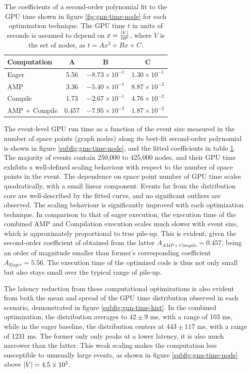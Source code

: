 \begin{table}[ht]
    \centering
    \begin{tabular}{|l|c|c|c|} \hline
      {Computation}   &  {A} & {B} & {C} \\ \hline 
      \hline
       Eager  & 5.56 & $-8.73\times 10^{-1}$ & $1.30\times 10^{-1}$ \\
       AMP & 3.36 & $-5.40\times 10^{-1}$ & $8.87\times10^{-2}$ \\
       Compile & 1.73 & $-2.67\times 10^{-1}$  & $4.76\times 10^{-2}$ \\
       AMP + Compile & 0.457 & $-7.95\times 10^{-2}$ & $1.87\times 10^{-2}$ \\ \hline
    \end{tabular}
    \caption{The coefficients of a second-order polynomial fit to the GPU time shown in figure \ref{fig:gnn-time-node} for each optimization technique. The GPU time $t$ in units of seconds is assumed to depend on $x=\frac{\abs{V}}{10^6}$, where $V$ is the set of nodes, as $t=Ax^2+Bx+C$.}
    \label{tab:gnn-time-node-fit}
\end{table}
The event-level GPU run time as a function of the event size measured in the number of space points (graph nodes) along its best-fit second-order polynomial is shown in figure \ref{subfig:gnn-time-node}, and the fitted coefficients in table \ref{tab:gnn-time-node-fit}.
The majority of events contain 250,000 to 425,000 nodes, and their GPU time exhibits a well-defined scaling behaviour with respect to the number of space points in the event.
The dependence on space point number of GPU time scales quadratically, with a small linear component. 
Events far from the distribution core are well-described by the fitted curve, and no significant outliers are observed. 
The scaling behaviour is significantly improved with each optimization technique. 
In comparison to that of eager execution, the execution time of the combined AMP and Compilation execution scales much slower with event size, which is approximately proportional to true pile-up. 
This is evident, given the second-order coefficient of obtained from the latter $A_{AMP+Compile}=0.457$, being an order of magnitude smaller than former's corresponding coefficient $A_{Eager}=5.56$.
The execution time of the optimized code is thus not only small but also stays small over the typical range of pile-up.

The latency reduction from these computational optimizations is also evident from both the mean and spread of the GPU time distribution observed in each scenario, demonstrated in figure \ref{subfig:gnn-time-hist}.
In the combined optimization, the distribution averages to $42\pm 9$ ms, with a range of 103 ms, while in the eager baseline, the distribution centers at $443\pm117$ ms, with a range of 1231 ms. 
The former only only peaks at a lower latency, it is also much narrower than the latter.
This weak scaling makes the computation less susceptible to unusually large events, as shown in figure \ref{subfig:gnn-time-node} above $\abs{V}=4.5\times 10^5$.


